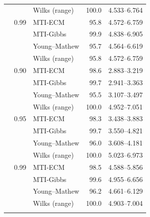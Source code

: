 \begin{longtable}{@{}rrlrr@{}}
 &  & Wilks (range) & 100.0 & 4.533--6.764 \\
\addlinespace[0.3em]
500 & 0.99 & MTI-ECM & 95.8 & 4.572--6.759 \\
 &  & MTI-Gibbs & 99.9 & 4.838--6.905 \\
 &  & Young--Mathew & 95.7 & 4.564--6.619 \\
 &  & Wilks (range) & 95.8 & 4.572--6.759 \\
\addlinespace[0.3em]
1000 & 0.90 & MTI-ECM & 98.6 & 2.883--3.219 \\
 &  & MTI-Gibbs & 99.7 & 2.941--3.363 \\
 &  & Young--Mathew & 95.5 & 3.107--3.497 \\
 &  & Wilks (range) & 100.0 & 4.952--7.051 \\
\addlinespace[0.3em]
1000 & 0.95 & MTI-ECM & 98.3 & 3.438--3.883 \\
 &  & MTI-Gibbs & 99.7 & 3.550--4.821 \\
 &  & Young--Mathew & 96.0 & 3.608--4.181 \\
 &  & Wilks (range) & 100.0 & 5.023--6.973 \\
\addlinespace[0.3em]
1000 & 0.99 & MTI-ECM & 98.5 & 4.588--5.856 \\
 &  & MTI-Gibbs & 99.6 & 4.955--6.656 \\
 &  & Young--Mathew & 96.2 & 4.661--6.129 \\
 &  & Wilks (range) & 100.0 & 4.903--7.004 \\
\addlinespace[0.3em]
\end{longtable}
\clearpage
